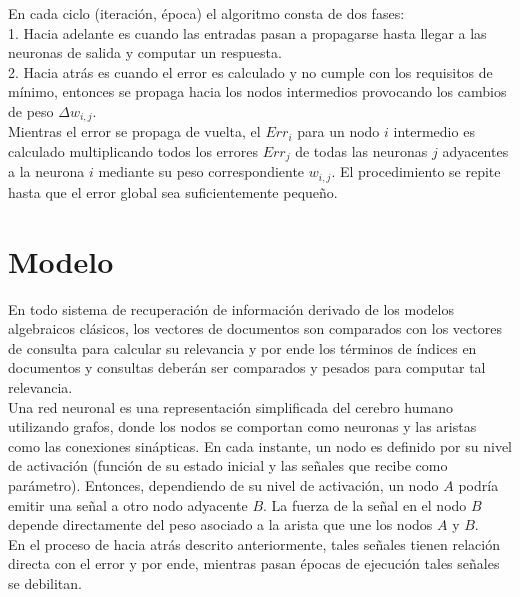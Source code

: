 \documentclass{llncs}
\begin{document}
En cada ciclo (iteraci\'on, \'epoca) el algoritmo consta de dos fases:\\

1. Hacia adelante es cuando las entradas pasan a propagarse hasta llegar a las neuronas de salida y computar un respuesta. \\

2. Hacia atr\'as es cuando el error es calculado y no cumple con los requisitos de m\'inimo, entonces se propaga hacia los nodos intermedios provocando los cambios
de peso $\Delta w_{i,j}.$\\

Mientras el error se propaga de vuelta, el $Err_i$ para un nodo $i$ intermedio es calculado multiplicando todos los errores $Err_j$ de todas las neuronas $j$ adyacentes
a la neurona $i$ mediante su peso correspondiente $w_{i,j}$. El procedimiento se repite hasta que el error global sea suficientemente peque\~no. \\

\section{Modelo}

En todo sistema de recuperaci\'on de informaci\'on derivado de los modelos algebraicos cl\'asicos, los vectores de documentos son comparados con los vectores de consulta
para calcular su relevancia y por ende los t\'erminos de \'indices en documentos y consultas deber\'an ser comparados y pesados para computar tal relevancia. \\


Una red neuronal es una representaci\'on simplificada del cerebro humano utilizando grafos, donde los nodos se comportan como neuronas y las aristas como las
conexiones sin\'apticas. En cada instante, un nodo es definido por su nivel de activaci\'on (funci\'on de su estado inicial y las se\~nales que recibe como par\'ametro).
Entonces, dependiendo de su nivel de activaci\'on, un nodo $A$ podr\'ia emitir una se\~nal a otro nodo adyacente $B$. La fuerza de la se\~nal en el nodo $B$
depende directamente del peso asociado a la arista que une los nodos $A$ y $B$.\\

En el proceso de hacia atr\'as descrito anteriormente, tales se\~nales tienen relaci\'on directa con el error y por ende, mientras pasan \'epocas de ejecuci\'on tales
se\~nales se debilitan.\\
\end{document}
